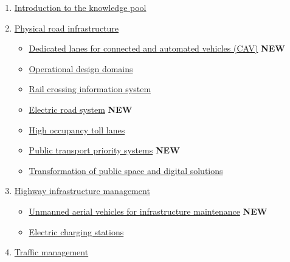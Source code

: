 \documentclass[
]{book}
\providecommand{\tightlist}{%
  \setlength{\itemsep}{0pt}\setlength{\parskip}{0pt}}
\begin{document}
\begin{enumerate}
\def\labelenumi{\arabic{enumi}.}
\tightlist
\item
  \protect\hyperlink{intro}{Introduction to the knowledge pool}
\item
  \protect\hyperlink{infrastructure}{Physical road infrastructure}

  \begin{itemize}
  \tightlist
  \item
    \protect\hyperlink{dedicated_lanes}{Dedicated lanes for connected and automated vehicles (CAV)} \textbf{NEW}
  \item
    \protect\hyperlink{ODD}{Operational design domains}
  \item
    \protect\hyperlink{rail_crossing_info_system}{Rail crossing information system}
  \item
    \protect\hyperlink{ers}{Electric road system} \textbf{NEW}
  \item
    \protect\hyperlink{high_occupancy}{High occupancy toll lanes}
  \item
    \protect\hyperlink{public_trans_priority}{Public transport priority systems} \textbf{NEW}
  \item
    \protect\hyperlink{transformation_public_space}{Transformation of public space and digital solutions}
  \end{itemize}
\item
  \protect\hyperlink{highway}{Highway infrastructure management}

  \begin{itemize}
  \tightlist
  \item
    \protect\hyperlink{uav}{Unmanned aerial vehicles for infrastructure maintenance} \textbf{NEW}
  \item
    \protect\hyperlink{charging_station}{Electric charging stations}
  \end{itemize}
\item
  \protect\hyperlink{traffic}{Traffic management}


\end{enumerate}
\end{document}
